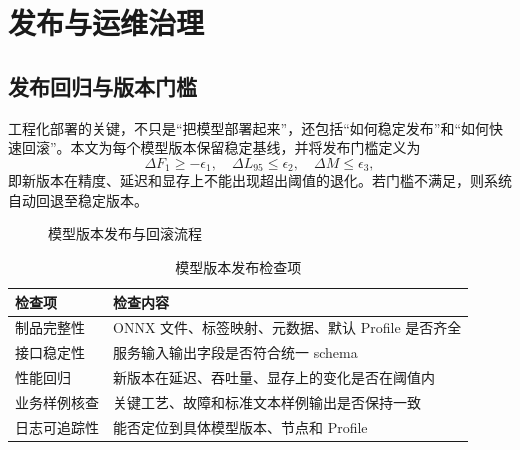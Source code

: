 \section{发布与运维治理}
\subsection{发布回归与版本门槛}
工程化部署的关键，不只是“把模型部署起来”，还包括“如何稳定发布”和“如何快速回滚”。本文为每个模型版本保留稳定基线，并将发布门槛定义为
\begin{equation}
\Delta F_{1}\geq -\epsilon_{1},\quad \Delta L_{95}\leq \epsilon_{2},\quad \Delta M\leq \epsilon_{3},
\label{eq:release_gate}
\end{equation}
即新版本在精度、延迟和显存上不能出现超出阈值的退化。若门槛不满足，则系统自动回退至稳定版本。

\begin{figure}[htbp]
  \centering
  \caption{模型版本发布与回滚流程}
  \label{fig:deploy_release_compact}
\end{figure}

\begin{table}[htbp]
  \centering
  \caption{模型版本发布检查项}
  \vspace{0.5em}\wuhao
  \begin{tabularx}{\textwidth}{l X}
    \toprule
    检查项 & 检查内容 \\
    \midrule
    制品完整性 & ONNX 文件、标签映射、元数据、默认 Profile 是否齐全 \\
    接口稳定性 & 服务输入输出字段是否符合统一 schema \\
    性能回归 & 新版本在延迟、吞吐量、显存上的变化是否在阈值内 \\
    业务样例核查 & 关键工艺、故障和标准文本样例输出是否保持一致 \\
    日志可追踪性 & 能否定位到具体模型版本、节点和 Profile \\
    \bottomrule
  \end{tabularx}
\label{tab:release_gate_compact}
\end{table}

